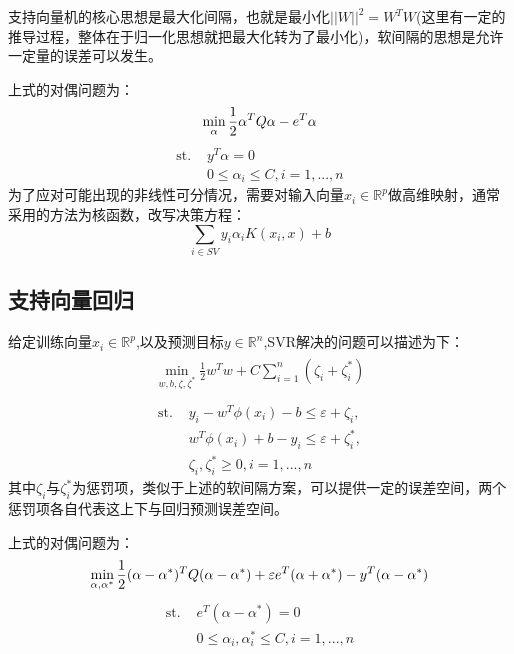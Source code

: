 \documentclass{ctexart}
\begin{document}
支持向量机的核心思想是最大化间隔，也就是最小化$||W||^2 = W^T W$(这里有一定的推导过程，整体在于归一化思想就把最大化转为了最小化)，软间隔的思想是允许一定量的误差可以发生。

上式的对偶问题为：
\begin{equation}
 \min_{\alpha} \frac{1}{2} \alpha^T Q \alpha - e^T \alpha\\ 
\end{equation}
\begin{equation}
	\begin{split}
	\textrm {st. \ \ \ \ \  } & y^T \alpha = 0\\
	& 0 \leq \alpha_i \leq C, i=1, ..., n\end{split}
\end{equation}
为了应对可能出现的非线性可分情况，需要对输入向量$x_i \in \mathbb{R}^p$做高维映射，通常采用的方法为核函数，改写决策方程：
\begin{equation}
	\sum_{i\in SV} y_i \alpha_i K(x_i, x) + b
\end{equation}


\subsection{支持向量回归}
给定训练向量$x_i \in \mathbb{R}^p$,以及预测目标$y \in \mathbb{R}^n$,SVR解决的问题可以描述为下：
 \begin{align}\begin{aligned} \min_ {w, b, \zeta, \zeta^*} \frac{1}{2} w^T w + C \sum_{i=1}^{n} (\zeta_i + \zeta_i^*)\\\end{aligned}\end{align} 
\begin{equation}
	\begin{split}\textrm {st.\ \ \ \     } & y_i - w^T \phi (x_i) - b \leq \varepsilon + \zeta_i,\\
	& w^T \phi (x_i) + b - y_i \leq \varepsilon + \zeta_i^*,\\
	& \zeta_i, \zeta_i^* \geq 0, i=1, ..., n\end{split}
\end{equation}
其中$\zeta_i$与$\zeta^{*}_i$为惩罚项，类似于上述的软间隔方案，可以提供一定的误差空间，两个惩罚项各自代表这上下与回归预测误差空间。

上式的对偶问题为：
\begin{equation}
	 \min_{\alpha, \alpha^*} \frac{1}{2} (\alpha - \alpha^*)^T Q (\alpha - \alpha^*) + \varepsilon e^T (\alpha + \alpha^*) - y^T (\alpha - \alpha^*)\\
\end{equation}
\begin{equation}
	\begin{split}
	\textrm {st.  \ \ \ \ \  \ \ \ \ \ \ \ } & e^T (\alpha - \alpha^*) = 0\\
	& 0 \leq \alpha_i, \alpha_i^* \leq C, i=1, ..., n\end{split}
\end{equation}
\end{document}
